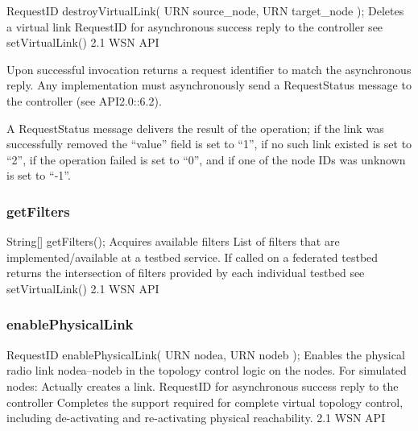 \begin{apidoc}
	{RequestID destroyVirtualLink( URN source_node, URN target_node );} %
	{Deletes a virtual link} %
	{ 
	} %
	{RequestID for asynchronous success reply to the controller} %
	{see setVirtualLink()} %
	{2.1 WSN API} %
\end{apidoc}

Upon successful invocation returns a request identifier to match the asynchronous reply. Any implementation must asynchronously send a RequestStatus message to the controller (see API2.0::6.2).

A RequestStatus message delivers the result of the operation; if the link was successfully removed the ``value'' field is set to ``1'', if no such link existed is set to ``2'', if the operation failed is set to ``0'', and if one of the node IDs was unknown is set to ``-1''.

			\subsubsection{getFilters}


\begin{apidoc}
	{String[] getFilters();} %
	{Acquires available filters} %
	{ } %
	{List of filters that are implemented/available at a testbed service. If called on a federated testbed returns the intersection of filters provided by each individual testbed} %
	{see setVirtualLink()} %
	{2.1 WSN API} %
\end{apidoc}

			\subsubsection{enablePhysicalLink}

\begin{apidoc}
	{RequestID enablePhysicalLink( URN nodea, URN nodeb );} %
	{Enables the physical radio link nodea--nodeb in the topology control logic on the nodes. For simulated nodes: Actually creates a link.} %
	{
	} %
	{RequestID for asynchronous success reply to the controller} %
	{Completes the support required for complete virtual topology control, including de-activating and re-activating physical reachability.} %
	{2.1 WSN API} %
\end{apidoc}

